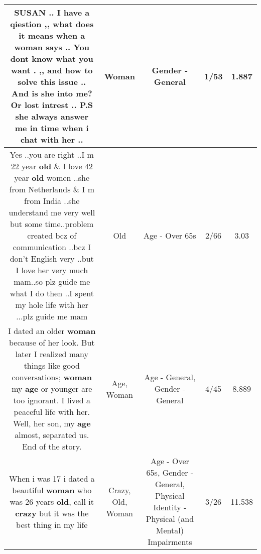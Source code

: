 \documentclass[11pt]{article}
\newlength\mylength
\begin{document}
\begin{center}
\begin{longtable}{|C{.65\mylength}|C{.30\mylength}|C{.12\mylength}|C{.12\mylength}|C{.12\mylength}|}
  \small SUSAN .. I have a qiestion ,, what does it means when a \textbf{woman} says .. You dont know what you want . ,, and how to solve this issue  .. And is she into me? Or lost intrest .. P.S she always answer me in time when i chat with her ..\normalsize   & Woman & Gender - General & 1/53 & 1.887 \\  \hline
  \small Yes ..you are  right ..I m 22 year \textbf{old} \& I love 42 year \textbf{old} women ..she from Netherlands \& I m from India ..she understand me very well but some time..problem created bcz of communication ..bcz I don't English very ..but I love her very much mam..so plz guide me what I do then ..I spent my hole life with her ...plz guide me mam\normalsize   & Old & Age - Over 65s & 2/66 & 3.03 \\  \hline
  \small I dated an older \textbf{woman} because of her look. But later I realized many things like good conversations; \textbf{woman} my \textbf{age} or younger are too ignorant. I lived a peaceful life with her. Well, her son, my \textbf{age} almost, separated us. End of the story.\normalsize   & Age, Woman & Age - General, Gender - General & 4/45 & 8.889 \\  \hline
  \small When i was 17 i dated a beautiful \textbf{woman} who was 26 years \textbf{old}, call it \textbf{crazy} but it was the best thing in my life\normalsize   & Crazy, Old, Woman & Age - Over 65s, Gender - General, Physical Identity - Physical (and Mental) Impairments & 3/26 & 11.538 \\  \hline

\end{longtable}
\end{center}
\end{document}
